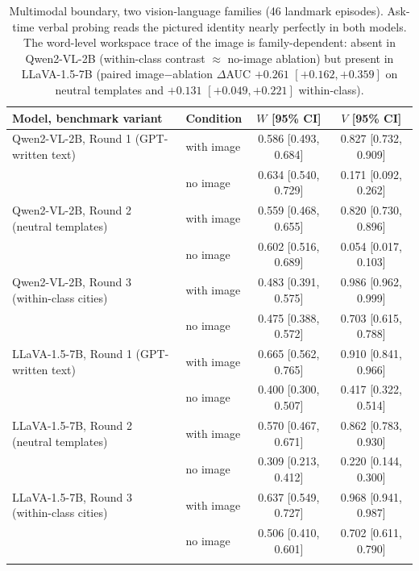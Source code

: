 \begin{table}[h]
\centering
\caption{Multimodal boundary, two vision-language families (46 landmark
episodes). Ask-time verbal probing reads the pictured identity nearly
perfectly in both models. The word-level workspace trace of the image is
family-dependent: absent in Qwen2-VL-2B (within-class contrast $\approx$
no-image ablation) but present in LLaVA-1.5-7B (paired image$-$ablation
$\Delta$AUC $+0.261$ $[+0.162, +0.359]$ on neutral templates and $+0.131$
$[+0.049, +0.221]$ within-class).}
\label{tab:appA9}
\small
\begin{tabular}{llcc}
\toprule
Model, benchmark variant & Condition & $W$ [95\% CI] & $V$ [95\% CI] \\
\midrule
Qwen2-VL-2B, Round 1 (GPT-written text) & with image & 0.586 [0.493, 0.684] & 0.827 [0.732, 0.909] \\
 & no image & 0.634 [0.540, 0.729] & 0.171 [0.092, 0.262] \\
\addlinespace
Qwen2-VL-2B, Round 2 (neutral templates) & with image & 0.559 [0.468, 0.655] & 0.820 [0.730, 0.896] \\
 & no image & 0.602 [0.516, 0.689] & 0.054 [0.017, 0.103] \\
\addlinespace
Qwen2-VL-2B, Round 3 (within-class cities) & with image & 0.483 [0.391, 0.575] & 0.986 [0.962, 0.999] \\
 & no image & 0.475 [0.388, 0.572] & 0.703 [0.615, 0.788] \\
\addlinespace
LLaVA-1.5-7B, Round 1 (GPT-written text) & with image & 0.665 [0.562, 0.765] & 0.910 [0.841, 0.966] \\
 & no image & 0.400 [0.300, 0.507] & 0.417 [0.322, 0.514] \\
\addlinespace
LLaVA-1.5-7B, Round 2 (neutral templates) & with image & 0.570 [0.467, 0.671] & 0.862 [0.783, 0.930] \\
 & no image & 0.309 [0.213, 0.412] & 0.220 [0.144, 0.300] \\
\addlinespace
LLaVA-1.5-7B, Round 3 (within-class cities) & with image & 0.637 [0.549, 0.727] & 0.968 [0.941, 0.987] \\
 & no image & 0.506 [0.410, 0.601] & 0.702 [0.611, 0.790] \\
\addlinespace
\bottomrule
\end{tabular}
\end{table}
